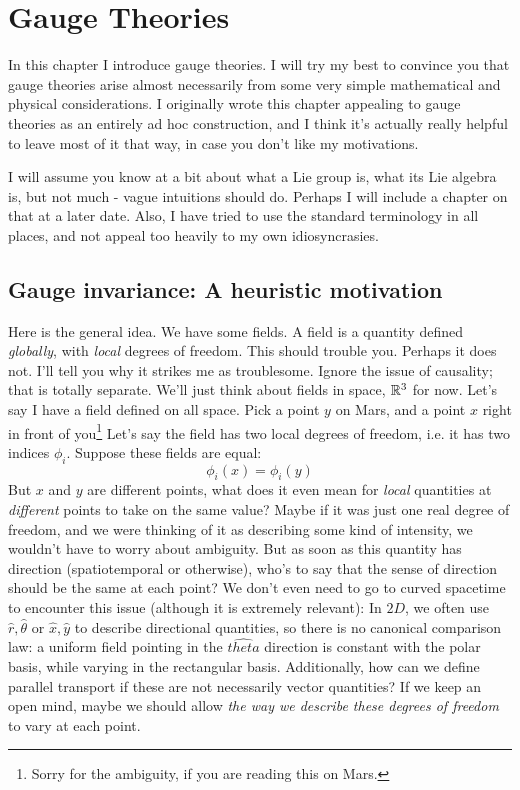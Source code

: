 \documentclass[main.tex]{subfiles}
\begin{document}
\chapter{Gauge Theories}
In this chapter I introduce gauge theories. I will try my best to convince you that gauge theories arise almost necessarily from some very simple mathematical and physical considerations. I originally wrote this chapter appealing to gauge theories as an entirely ad hoc construction, and I think it's actually really helpful to leave most of it that way, in case you don't like my motivations.

I will assume you know at a bit about what a Lie group is, what its Lie algebra is, but not much - vague intuitions should do. Perhaps I will include a chapter on that at a later date. Also, I have tried to use the standard terminology in all places, and not appeal too heavily to my own idiosyncrasies.


\section{Gauge invariance: A heuristic motivation}

Here is the general idea. We have some fields. A field is a quantity defined \textit{globally}, with \textit{local} degrees of freedom. This should trouble you. Perhaps it does not. I'll tell you why it strikes me as troublesome. Ignore the issue of causality; that is totally separate. We'll just think about fields in space, $\mathbb{R}^3$ for now. Let's say I have a field defined on all space. Pick a point $y$ on Mars, and a point $x$ right in front of you\footnote{Sorry for the ambiguity, if you are reading this on Mars.} Let's say the field has two local degrees of freedom, i.e. it has two indices $\phi_i$. Suppose these fields are equal:
\[
\phi_i (x) = \phi_i (y)
\]
But $x$ and $y$ are different points, what does it even mean for \textit{local} quantities at \textit{different} points to take on the same value? Maybe if it was just one real degree of freedom, and we were thinking of it as describing some kind of intensity, we wouldn't have to worry about ambiguity. But as soon as this quantity has direction (spatiotemporal or otherwise), who's to say that the sense of direction should be the same at each point? We don't even need to go to curved spacetime to encounter this issue (although it is extremely relevant): In $2D$, we often use $\hat{r},\hat{\theta}$ or $\hat{x},\hat{y}$ to describe directional quantities, so there is no canonical comparison law: a uniform field pointing in the $\hat{theta}$ direction is constant with the polar basis, while varying in the rectangular basis. Additionally, how can we define parallel transport if these are not necessarily vector quantities? If we keep an open mind, maybe we should allow \textit{the way we describe these degrees of freedom} to vary at each point.
\end{document}
